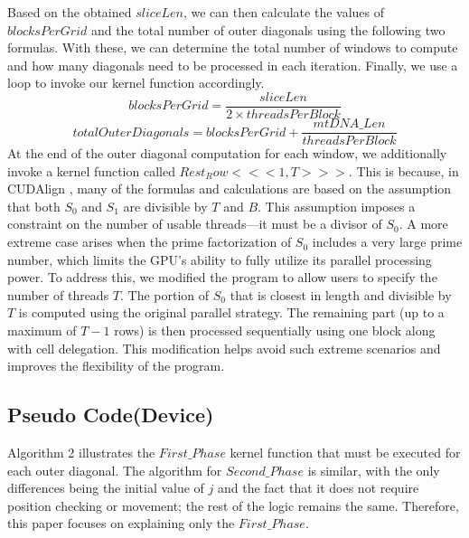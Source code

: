 \documentclass[PhD]{PHlab-thesis}
\begin{document}
Based on the obtained $sliceLen$, we can then calculate the values of $blocksPerGrid$ and the total number of outer diagonals using the following two formulas. With these, we can determine the total number of windows to compute and how many diagonals need to be processed in each iteration. Finally, we use a loop to invoke our kernel function accordingly.
\[
blocksPerGrid = \frac{sliceLen}{2\times threadsPerBlock}
\]
\[
totalOuterDiagonals = blocksPerGrid + \frac{mtDNA\_Len}{threadsPerBlock}
\]
At the end of the outer diagonal computation for each window, we additionally invoke a kernel function called $Rest_Row<<<1, T>>>$. This is because, in CUDAlign \cite{CUDAlign}, many of the formulas and calculations are based on the assumption that both $S_0$ and $S_1$ are divisible by $T$ and $B$. This assumption imposes a constraint on the number of usable threads—it must be a divisor of $S_0$. A more extreme case arises when the prime factorization of $S_0$ includes a very large prime number, which limits the GPU's ability to fully utilize its parallel processing power. To address this, we modified the program to allow users to specify the number of threads $T$. The portion of $S_0$ that is closest in length and divisible by $T$ is computed using the original parallel strategy. The remaining part (up to a maximum of $T-1$ rows) is then processed sequentially using one block along with cell delegation. This modification helps avoid such extreme scenarios and improves the flexibility of the program.

\subsection{Pseudo Code(Device)}
Algorithm 2 illustrates the \textbf{$First\_Phase$} kernel function that must be executed for each outer diagonal. The algorithm for \textbf{$Second\_Phase$} is similar, with the only differences being the initial value of $j$ and the fact that it does not require position checking or movement; the rest of the logic remains the same. Therefore, this paper focuses on explaining only the \textbf{$First\_Phase$}.
\end{document}
